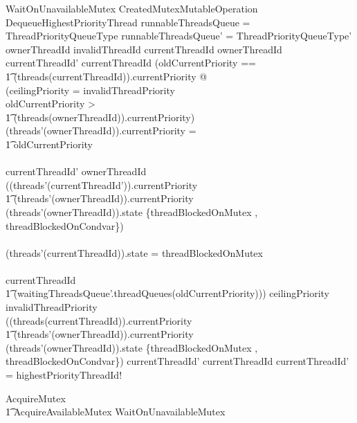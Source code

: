 \documentclass[11pt,letterpaper,twoside,openany]{book}
\begin{document}
\begin{schema}{WaitOnUnavailableMutex}
   CreatedMutexMutableOperation \\
   DequeueHighestPriorityThread
\where
   runnableThreadsQueue = \theta ThreadPriorityQueueType
\also
   runnableThreadsQueue' = \theta ThreadPriorityQueueType'
\also
   ownerThreadId \neq invalidThreadId
\also
   currentThreadId \neq ownerThreadId
\also
   currentThreadId' \neq currentThreadId
\also
(\LET oldCurrentPriority == \\
\t1 (threads(currentThreadId)).currentPriority @ \\
(ceilingPriority = invalidThreadPriority \land \\
 oldCurrentPriority > \\
 \t1 (threads(ownerThreadId)).currentPriority) \implies \\
 (threads'(ownerThreadId)).currentPriority = \\
 \t1 oldCurrentPriority \\
\land \\
 currentThreadId' \neq ownerThreadId \implies \\
 ((threads'(currentThreadId')).currentPriority \geq \\
 \t1 (threads'(ownerThreadId)).currentPriority \lor \\
 (threads'(ownerThreadId)).state \in  \{threadBlockedOnMutex , threadBlockedOnCondvar\}) \\
\land \\
 (threads'(currentThreadId)).state = threadBlockedOnMutex \\
\land \\
currentThreadId \in \\
\t1 \ran (waitingThreadsQueue'.threadQueues(oldCurrentPriority)))
\also
ceilingPriority \neq invalidThreadPriority \implies \\
((threads(currentThreadId)).currentPriority \leq \\
 \t1 (threads'(ownerThreadId)).currentPriority \land \\
 (threads'(ownerThreadId)).state \in \{threadBlockedOnMutex , threadBlockedOnCondvar\})
\also
   currentThreadId' \neq currentThreadId
\also
   currentThreadId' = highestPriorityThreadId!
\end{schema}

\begin{zed}
   AcquireMutex  \\
   \t1 AcquireAvailableMutex \lor WaitOnUnavailableMutex
\end{zed}
\end{document}
